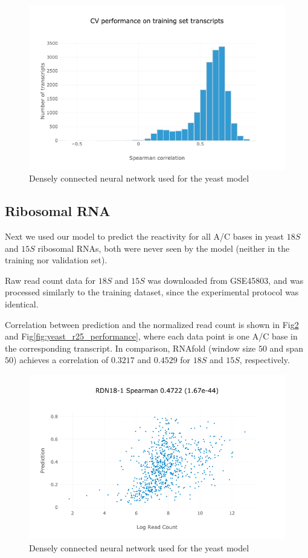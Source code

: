 \documentclass{proposal}
\begin{document}
\begin{figure}[h!]
\includegraphics[width=\textwidth]{yeast_cv_performance.png}
\caption{Densely connected neural network used for the yeast model}
\label{fig:yeast_cv_performance}
\centering
\end{figure}

\subsection{Ribosomal RNA}

Next we used our model to predict the reactivity for all A/C bases in yeast $18S$ and $15S$ ribosomal RNAs,
both were never seen by the model (neither in the training nor validation set).

Raw read count data for $18S$ and $15S$ was downloaded from GSE45803, and was processed similarly to the training dataset,
since the experimental protocol was identical.

Correlation between prediction and the normalized read count is shown in Fig\ref{fig:yeast_r18_performance} and Fig\ref{fig:yeast_r25_performance},
where each data point is one A/C base in the corresponding transcript.
In comparison, RNAfold (window size $50$ and span $50$) achieves a correlation of $0.3217$ and $0.4529$ for $18S$ and $15S$, respectively.

\begin{figure}[h!]
\includegraphics[width=\textwidth]{yeast_r18_performance.png}
\caption{Densely connected neural network used for the yeast model}
\label{fig:yeast_r18_performance}
\centering
\end{figure}
\end{document}
